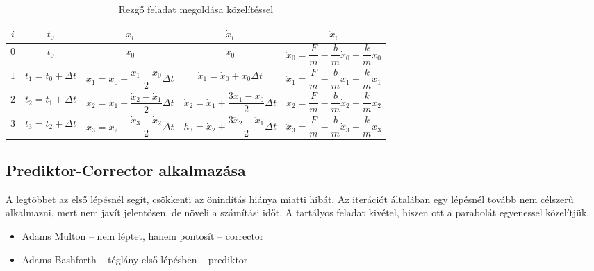 \documentclass[../../main.tex]{subfiles}
\begin{document}
\bgroup
\def\arraystretch{2}
\setlength{\arrayrulewidth}{1pt}
\begin{table}[H]
  \small
  \centering\begin{tabular}{|*{5}{c|}}
    \hline
    \rowcolor{yellow!70!gray}
    $i$ & $t_0$                  & $x_i$                                                 & $\dot x_i$                                                         & $\ddot x_i$
    \\ \hline
    $0$ & $t_0$                  & $x_0$                                                 & $\dot x_0$                                                         & $\ddot x_0 = \dfrac{F}{m} - \dfrac{b}{m} \dot x_0 - \dfrac{k}{m} x_0$
    \\  \rowcolor{gray!10}
    $1$ & $t_1 = t_0 + \Delta t$ & $x_1 = x_0 + \dfrac{\dot x_1 - \dot x_0}{2} \Delta t$ & $\dot x_1 = \dot x_0 + \ddot x_0 \Delta t$                         & $\ddot x_1 = \dfrac{F}{m} - \dfrac{b}{m} \dot x_1 - \dfrac{k}{m} x_1$
    \\
    $2$ & $t_2 = t_1 + \Delta t$ & $x_2 = x_1 + \dfrac{\dot x_2 - \dot x_1}{2} \Delta t$ & $\dot x_2 = \dot x_1 + \dfrac{3\ddot x_1 - \ddot x_0}{2} \Delta t$ & $\ddot x_2 = \dfrac{F}{m} - \dfrac{b}{m} \dot x_2 - \dfrac{k}{m} x_2$
    \\  \rowcolor{gray!10}
    $3$ & $t_3 = t_2 + \Delta t$ & $x_3 = x_2 + \dfrac{\dot x_3 - \dot x_2}{2} \Delta t$ & $\dot h_3 = \dot x_2 + \dfrac{3\ddot x_2 - \ddot x_1}{2} \Delta t$ & $\ddot x_3 = \dfrac{F}{m} - \dfrac{b}{m} \dot x_3 - \dfrac{k}{m} x_3$
    \\ \hline
  \end{tabular}
  \caption{Rezgő feladat megoldása közelítéssel}
  \label{fig:int2}
\end{table}
\egroup

\subsection{Prediktor-Corrector alkalmazása}

A legtöbbet az első lépésnél segít, csökkenti az önindítás hiánya miatti hibát.
Az iterációt általában egy lépésnél tovább nem célszerű alkalmazni, mert nem
javít jelentősen, de növeli a számítási időt. A tartályos feladat kivétel,
hiszen ott a parabolát egyenessel közelítjük.
\begin{itemize}
  \item Adams Multon -- nem léptet, hanem pontosít -- corrector
  \item Adams Bashforth -- téglány első lépésben -- prediktor
\end{itemize}
\end{document}
